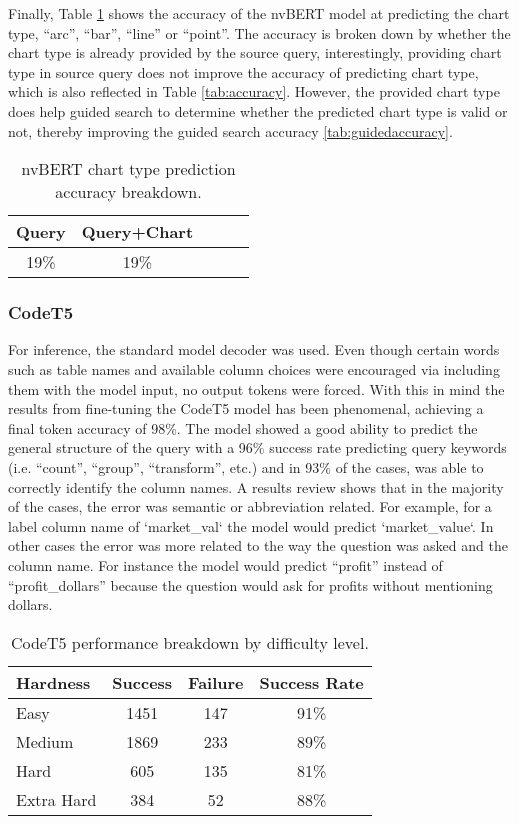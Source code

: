 \documentclass[
	a4paper, %
	10pt, %
	unnumberedsections, %
	twoside, %
]{t0003}
\begin{document}
Finally, Table \ref{tab:chartaccuracy} shows the accuracy of the nvBERT model at predicting the chart type, ``arc'', ``bar'', ``line'' or ``point''. The accuracy is broken down by whether the chart type is already provided by the source query, interestingly, providing chart type in source query does not improve the accuracy of predicting chart type, which is also reflected in Table \ref{tab:accuracy}. However, the provided chart type does help guided search to determine whether the predicted chart type is valid or not, thereby improving the guided search accuracy \ref{tab:guidedaccuracy}.

\begin{table}
	\caption{nvBERT chart type prediction accuracy breakdown.}
	\centering
	\begin{tabular}{ccccc}
		\toprule
		Query & Query+Chart \\
		\midrule
		19\% & 19\% \\
		\bottomrule
	\end{tabular}
	\label{tab:chartaccuracy}
\end{table}

\subsubsection{CodeT5} For inference, the standard model decoder was used. Even though certain words such as table names and available column choices were encouraged via including them with the model input, no output tokens were forced. With this in mind the results from fine-tuning the CodeT5 model has been phenomenal, achieving a final token accuracy of 98\%. The model showed a good ability to predict the general structure of the query with a 96\% success rate predicting query keywords (i.e. “count”, “group”, “transform”, etc.) and in 93\% of the cases, was able to correctly identify the column names. A results review shows that in the majority of the cases, the error was semantic or abbreviation related. For example, for a label column name of `market\_val` the model would predict `market\_value`. In other cases the error was more related to the way the question was asked and the column name. For instance the model would predict “profit” instead of “profit\_dollars” because the question would ask for profits without mentioning dollars.

\begin{table}
	\caption{CodeT5 performance breakdown by difficulty level.}
	\centering
	\begin{tabular}{lccc}
		\toprule
		Hardness & Success & Failure & Success Rate \\
		\midrule
		Easy & 1451 & 147 & 91\% \\
		Medium & 1869 & 233 & 89\% \\
		Hard & 605 & 135 & 81\% \\
		Extra Hard & 384 & 52 & 88\% \\
		\bottomrule
	\end{tabular}
	\label{tab:codet5rate}
\end{table}
\end{document}
